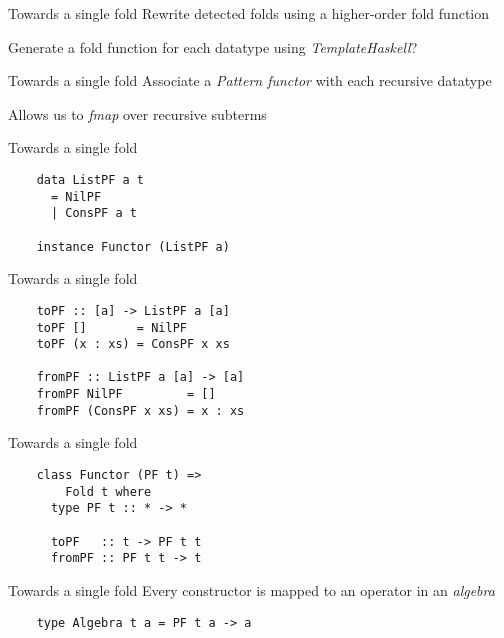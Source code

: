 \documentclass[20pt]{beamer}
\newcommand{\vspaced}{
    \vspace{5mm}
}
\begin{document}
\begin{frame}[fragile]{Towards a single fold}
    Rewrite detected folds using a higher-order fold function \\
    \vspaced
    Generate a fold function for each datatype using \emph{TemplateHaskell}? \\
\end{frame}

\begin{frame}[fragile]{Towards a single fold}
    Associate a \emph{Pattern functor} with each recursive datatype \\
    \vspaced
    Allows us to \emph{fmap} over recursive subterms \\
\end{frame}

\begin{frame}[fragile]{Towards a single fold}
    \begin{lstlisting}
    data ListPF a t
      = NilPF
      | ConsPF a t

    instance Functor (ListPF a)
    \end{lstlisting}
\end{frame}

\begin{frame}[fragile]{Towards a single fold}
    \begin{lstlisting}
    toPF :: [a] -> ListPF a [a]
    toPF []       = NilPF
    toPF (x : xs) = ConsPF x xs

    fromPF :: ListPF a [a] -> [a]
    fromPF NilPF         = []
    fromPF (ConsPF x xs) = x : xs
    \end{lstlisting}
\end{frame}

\begin{frame}[fragile]{Towards a single fold}
    \begin{lstlisting}
    class Functor (PF t) =>
        Fold t where
      type PF t :: * -> *

      toPF   :: t -> PF t t
      fromPF :: PF t t -> t
    \end{lstlisting}
\end{frame}

\begin{frame}[fragile]{Towards a single fold}
    Every constructor is mapped to an operator in an \emph{algebra} \\
    \vspaced
    \begin{lstlisting}
    type Algebra t a = PF t a -> a
    \end{lstlisting}
\end{frame}
\end{document}
